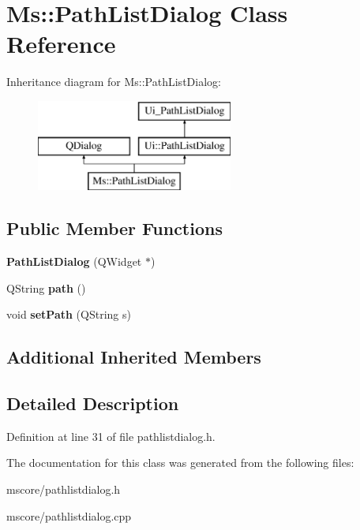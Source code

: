 \hypertarget{class_ms_1_1_path_list_dialog}{}\section{Ms\+:\+:Path\+List\+Dialog Class Reference}
\label{class_ms_1_1_path_list_dialog}
Inheritance diagram for Ms\+:\+:Path\+List\+Dialog\+:\begin{figure}[H]
\begin{center}
\leavevmode
\includegraphics[height=3.000000cm]{class_ms_1_1_path_list_dialog}
\end{center}
\end{figure}
\subsection*{Public Member Functions}
\begin{DoxyCompactItemize}
\item 
\mbox{\label{class_ms_1_1_path_list_dialog_a0a77e03a8c9b97eab02136a291e31e37}} 
{\bfseries Path\+List\+Dialog} (Q\+Widget $\ast$)
\item 
\mbox{\label{class_ms_1_1_path_list_dialog_a5c8ae222a65abc0cd1207a306564ecd7}} 
Q\+String {\bfseries path} ()
\item 
\mbox{\label{class_ms_1_1_path_list_dialog_a41ff0bb0aae8fa2707b8988d0361a1ba}} 
void {\bfseries set\+Path} (Q\+String s)
\end{DoxyCompactItemize}
\subsection*{Additional Inherited Members}


\subsection{Detailed Description}


Definition at line 31 of file pathlistdialog.\+h.



The documentation for this class was generated from the following files\+:\begin{DoxyCompactItemize}
\item 
mscore/pathlistdialog.\+h\item 
mscore/pathlistdialog.\+cpp\end{DoxyCompactItemize}
